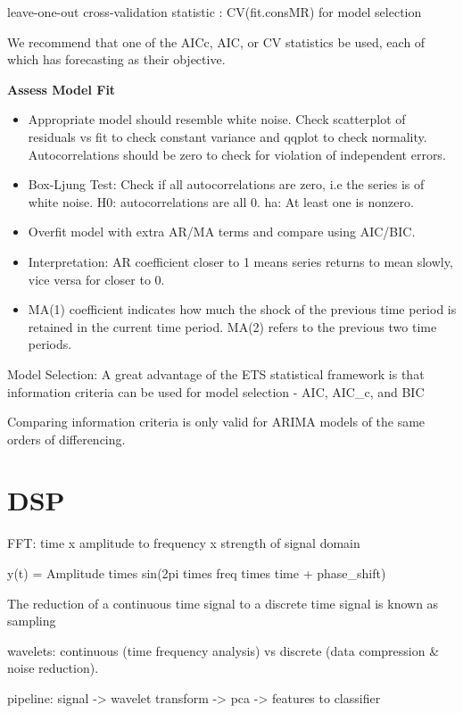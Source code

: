 \documentclass[]{book}
\begin{document}
leave-one-out cross-validation statistic : CV(fit.consMR) for model selection

We recommend that one of the AICc, AIC, or CV statistics be used, each of which has forecasting as their objective.

\textbf{Assess Model Fit}

\begin{itemize}
\item
  Appropriate model should resemble white noise. Check scatterplot of residuals vs fit to check constant variance and qqplot to check normality. Autocorrelations should be zero to check for violation of independent errors.
\item
  Box-Ljung Test: Check if all autocorrelations are zero, i.e the series is of white noise. H0: autocorrelations are all 0. ha: At least one is nonzero.
\item
  Overfit model with extra AR/MA terms and compare using AIC/BIC.
\item
  Interpretation: AR coefficient closer to 1 means series returns to mean slowly, vice versa for closer to 0.
\item
  MA(1) coefficient indicates how much the shock of the previous time period is retained in the current time period. MA(2) refers to the previous two time periods.
\end{itemize}

Model Selection: A great advantage of the ETS statistical framework is that information criteria can be used for model selection - AIC, AIC\_c, and BIC

Comparing information criteria is only valid for ARIMA models of the same orders of differencing.

\hypertarget{dsp}{%
\section{DSP}\label{dsp}}

FFT: time x amplitude to frequency x strength of signal domain

y(t) = Amplitude times sin(2pi times freq times time + phase\_shift)

The reduction of a continuous time signal to a discrete time signal is known as sampling

wavelets: continuous (time frequency analysis) vs discrete (data compression \& noise reduction).

pipeline: signal -\textgreater{} wavelet transform -\textgreater{} pca -\textgreater{} features to classifier
\end{document}
